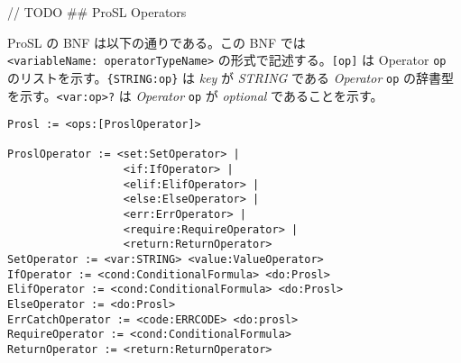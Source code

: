 // TODO \#\# ProSL Operators

ProSL の BNF は以下の通りである。この BNF では
\texttt{\textless{}variableName:\ operatorTypeName\textgreater{}}
の形式で記述する。\texttt{{[}op{]}} は Operator \texttt{op}
のリストを示す。\texttt{\{STRING:op\}} は \emph{key} が \emph{STRING}
である \emph{Operator} \texttt{op}
の辞書型を示す。\texttt{\textless{}var:op\textgreater{}?} は
\emph{Operator} \texttt{op} が \emph{optional} であることを示す。

\begin{verbatim}
Prosl := <ops:[ProslOperator]>

ProslOperator := <set:SetOperator> |
                  <if:IfOperator> |
                  <elif:ElifOperator> |
                  <else:ElseOperator> |
                  <err:ErrOperator> |
                  <require:RequireOperator> |
                  <return:ReturnOperator>
SetOperator := <var:STRING> <value:ValueOperator>
IfOperator := <cond:ConditionalFormula> <do:Prosl>
ElifOperator := <cond:ConditionalFormula> <do:Prosl>
ElseOperator := <do:Prosl>
ErrCatchOperator := <code:ERRCODE> <do:prosl>
RequireOperator := <cond:ConditionalFormula>
ReturnOperator := <return:ReturnOperator>


\end{verbatim}
